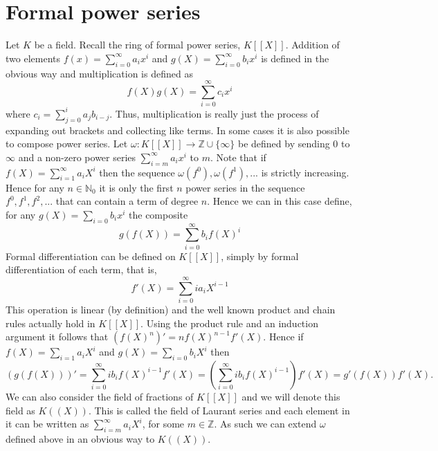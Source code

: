 \documentclass{article}
\newcommand{\mbb}[1]{\mathbb{#1}}
\numberwithin{equation}{section}
\begin{document}
\section{Formal power series}\label{sec: Formal power series}

Let $K$ be a field. Recall the ring of formal power series, $K[[X]]$. Addition of two elements $f(x) = \sum_{i = 0}^\infty a_ix^i$ and $g(X) = \sum_{i = 0}^\infty b_ix^i$ is defined in the obvious way and multiplication is defined as
$$f(X)g(X) = \sum_{i = 0}^{\infty}c_i x^i$$
where $c_i = \sum_{j = 0}^i a_j b_{i-j}$. Thus, multiplication is really just the process of expanding out brackets and collecting like terms. In some cases it is also possible to compose power series. Let $\omega : K[[X]] \to \mbb Z \cup \{\infty \}$ be defined by sending $0$ to $\infty$ and a non-zero power series $\sum_{i = m}^\infty a_i x^i$ to $m$. Note that if $f(X) = \sum_{i = 1}^\infty a_iX^i$ then the sequence $\omega(f^0), \omega(f^1), ...$ is strictly increasing. Hence for any $n \in \mbb N_0$ it is only the first $n$ power series in the sequence $f^0, f^1, f^2, ...$ that can contain a term of degree $n$.  
Hence we can in this case define, for any $g(X) = \sum_{i = 0} b_i x^i$ the composite
$$g(f(X)) = \sum_{i = 0}^\infty b_i f(X)^i$$
Formal differentiation can be defined on $K[[X]]$, simply by formal differentiation of each term, that is,
$$f'(X) = \sum_{i = 0}^\infty i a_{i} X^{i-1}$$
This operation is linear (by definition) and the well known product and chain rules actually hold in $K[[X]]$. Using the product rule and an induction argument it follows that $(f(X)^n)' = n f(X)^{n-1}f'(X)$. Hence if $f(X) = \sum_{i = 1} a_i X^i$ and $g(X) = \sum_{i = 0} b_i X^i$ then
$$(g(f(X)))' = \sum_{i = 0}^\infty ib_i f(X)^{i-1}f'(X) = (\sum_{i = 0}^\infty i b_i f(X)^{i-1})f'(X) = g'(f(X))f'(X).$$
We can also consider the field of fractions of $K[[X]]$ and we will denote this field as $K((X))$. This is called the field of Laurant series and each element in it can be written as $\sum_{i = m}^\infty a_i X^i$, for some $m \in \mbb Z$. As such we can extend $\omega$ defined above in an obvious way to $K((X))$.
\end{document}
